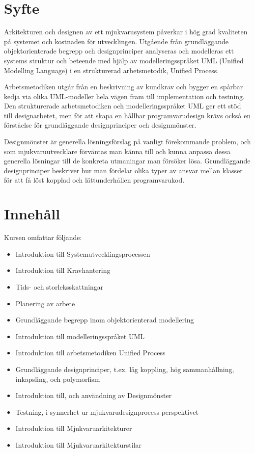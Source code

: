 \documentclass[10pt]{article}
\begin{document}
\begin{multicols}{2}
\section{Syfte}
Arkitekturen och designen av ett mjukvarusystem påverkar i hög grad
kvaliteten på systemet och kostnaden för utvecklingen. Utgående från
grundläggande objektorienterade begrepp och designprinciper analyseras
och modelleras ett systems struktur och beteende med hjälp av
modelleringsspråket UML (Unified Modelling Language) i en strukturerad
arbetsmetodik, Unified Process.

Arbetsmetodiken utgår från en beskrivning av kundkrav och bygger en
spårbar kedja via olika UML-modeller hela vägen fram till
implementation och testning. Den strukturerade arbetsmetodiken och
modelleringsspråket UML ger ett stöd till designarbetet, men för att
skapa en hållbar programvarudesign krävs också en förståelse för
grundläggande designprinciper och designmönster.

Designmönster är generella lösningsförslag på vanligt förekommande
problem, och som mjukvaruutvecklare förväntas man känna till och kunna
anpassa dessa generella lösningar till de konkreta utmaningar man
försöker lösa. Grundläggande designprinciper beskriver hur man
fördelar olika typer av ansvar mellan klasser för att få löst kopplad
och lättunderhållen programvarukod.
\section{Innehåll}
Kursen omfattar följande:

\begin{itemize}
\item Introduktion till Systemutvecklingsprocessen
\item Introduktion till Kravhantering
\item Tids- och storleksskattningar
\item Planering av arbete
\item Grundläggande begrepp inom objektorienterad modellering
\item Introduktion till modelleringsspråket UML
\item Introduktion till arbetsmetodiken Unified Process
\item Grundläggande designprinciper, t.ex. låg koppling, hög sammanhållning, inkapsling, och polymorfism
\item Introduktion till, och användning av Designmönster
\item Testning, i synnerhet ur mjukvarudesignprocess-perspektivet
\item Introduktion till Mjukvaruarkitekturer
\item Introduktion till Mjukvaruarkitekturstilar
\end{itemize}


\end{multicols}
\end{document}
